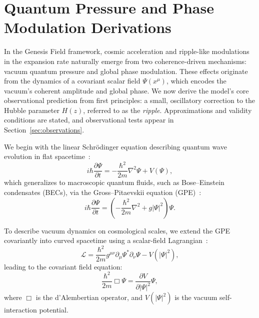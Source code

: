 \section{Quantum Pressure and Phase Modulation Derivations}
\label{sec:derivations}

In the Genesis Field framework, cosmic acceleration and ripple-like modulations in the expansion rate naturally emerge from two coherence-driven mechanisms: vacuum quantum pressure and global phase modulation. These effects originate from the dynamics of a covariant scalar field \( \Psi(x^\mu) \), which encodes the vacuum's coherent amplitude and global phase. We now derive the model’s core observational prediction from first principles: a small, oscillatory correction to the Hubble parameter \( H(z) \), referred to as the \emph{ripple}. Approximations and validity conditions are stated, and observational tests appear in Section~\ref{sec:observations}.

We begin with the linear Schrödinger equation describing quantum wave evolution in flat spacetime~\cite{Schrodinger1926}:
\begin{equation}
i\hbar \frac{\partial \Psi}{\partial t} = -\frac{\hbar^2}{2m}\nabla^2\Psi + V(\Psi),
\label{eq:schrodinger}
\end{equation}
which generalizes to macroscopic quantum fluids, such as Bose–Einstein condensates (BECs), via the Gross–Pitaevskii equation (GPE)~\cite{Gross1961,Pitaevskii1961}:
\begin{equation}
i\hbar \frac{\partial \Psi}{\partial t} = \left(-\frac{\hbar^2}{2m}\nabla^2 + g|\Psi|^2\right)\Psi.
\label{eq:gpe}
\end{equation}

To describe vacuum dynamics on cosmological scales, we extend the GPE covariantly into curved spacetime using a scalar-field Lagrangian~\cite{Barcelo2005,volovik2003universe}:
\begin{equation}
\mathcal{L} = \frac{\hbar^2}{2m} g^{\mu\nu} \partial_\mu \Psi^* \partial_\nu \Psi - V(|\Psi|^2),
\label{eq:genesis_lagrangian}
\end{equation}
leading to the covariant field equation:
\begin{equation}
\frac{\hbar^2}{2m}\Box\Psi = \frac{\partial V}{\partial |\Psi|^2}\Psi,
\label{eq:field_equation}
\end{equation}
where \( \Box \) is the d'Alembertian operator, and \( V(|\Psi|^2) \) is the vacuum self-interaction potential.

